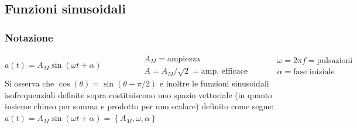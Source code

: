 \documentclass[a4paper]{article}
\begin{document}
\subsection{Funzioni sinusoidali}
\subsubsection*{Notazione}
\[a(t) = A_M \sin(\omega t + \alpha) \qquad \qquad \begin{aligned}
	&A_M = \text{ampiezza} \\
	&A = A_M/\sqrt{2} = \text{amp. efficace}
\end{aligned} \qquad \begin{aligned}
	&\omega = 2 \pi f = \text{pulsazioni} \\
	&\alpha = \text{fase iniziale}
\end{aligned}\]
Si osserva che \(\cos(\theta) = \sin(\theta + \pi/2)\) e inoltre le funzioni sinusoidali isofrequenziali definite sopra costituiscono
uno spazio vettoriale (in quanto insieme chiuso per somma e prodotto per uno scalare) definito come segue:
\(a(t) = A_M \sin(\omega t + \alpha) = \left\{A_M, \omega, \alpha\right\}\)
\end{document}
